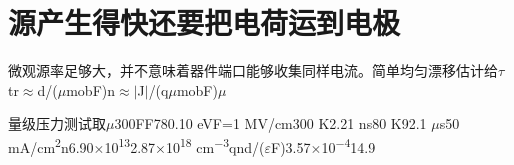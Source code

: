 \documentclass[11pt,a4paper]{article}
\begin{document}
\section{{\cjkfont 源产生得快还要把电荷运到电极}\allowbreak{}}\label{sec:49}
{\cjkfont 微观源率足够大，并不意味着器件端口能够收集同样电流。简单均匀漂移估计给}\allowbreak{}\ensuremath{\tau}tr\ensuremath{\approx}\allowbreak{}d/(\ensuremath{\mu}mobF)\allowbreak{}n\ensuremath{\approx}\allowbreak{}\ensuremath{\vert}J\ensuremath{\vert}/(q\ensuremath{\mu}mobF)\allowbreak{}\ensuremath{\mu}\allowbreak{}
\par
{\cjkfont 量级压力测试取}\allowbreak{}\ensuremath{\mu}300\allowbreak{}FF78\allowbreak{}0.10 eV\allowbreak{}F=\allowbreak{}1 MV/cm\allowbreak{}300 K\allowbreak{}2.21 ns\allowbreak{}80 K\allowbreak{}92.1 \ensuremath{\mu}s\allowbreak{}50 mA/cm\textsuperscript{2}\allowbreak{}n\allowbreak{}6.90\ensuremath{\times}10\textsuperscript{13}\allowbreak{}2.87\ensuremath{\times}10\textsuperscript{18} cm\textsuperscript{−3}\allowbreak{}qnd/(\ensuremath{\varepsilon}F)\allowbreak{}3.57\ensuremath{\times}10\textsuperscript{−4}\allowbreak{}14.9\allowbreak{}
\par
\end{document}
